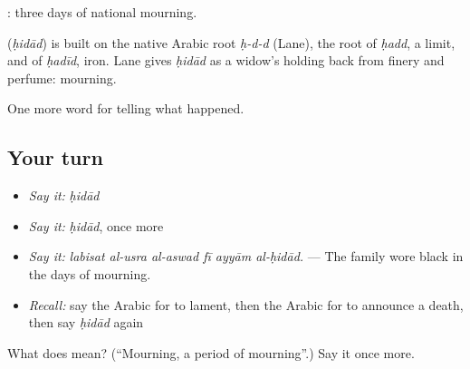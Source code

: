     : three days of national mourning.

\begin{cousinweb}
\textbf{} (\emph{ḥidād}) is built on the native Arabic root \emph{ḥ-d-d} (Lane), the root of \emph{ḥadd}, a limit, and of \emph{ḥadīd}, iron. Lane gives \emph{ḥidād} as a widow's holding back from finery and perfume: mourning.
\end{cousinweb}

\begin{grammarlens}[title={What you've built}]
One more word for telling what happened.
\end{grammarlens}

\subsection*{Your turn}
\begin{itemize}
\raggedright
  \item \emph{Say it:} \emph{ḥidād}
  \item \emph{Say it:} \emph{ḥidād}, once more
  \item \emph{Say it:} \emph{labisat al-usra al-aswad fī ayyām al-ḥidād.} — The family wore black in the days of mourning.
  \item \emph{Recall:} say the Arabic for to lament, then the Arabic for to announce a death, then say \emph{ḥidād} again
\end{itemize}

\begin{tcolorbox}[breakable,colback=teal!4,colframe=teal!35!black,title={Before you move on}]
What does  mean? (\textquotedblleft{}Mourning, a period of mourning\textquotedblright{}.) Say it once more.
\end{tcolorbox}
